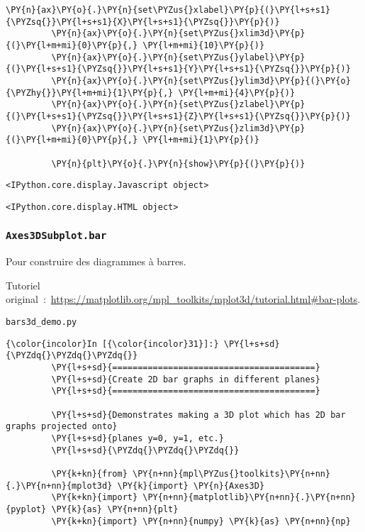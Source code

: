 \begin{Verbatim}[commandchars=\\\{\}]
         \PY{n}{ax}\PY{o}{.}\PY{n}{set\PYZus{}xlabel}\PY{p}{(}\PY{l+s+s1}{\PYZsq{}}\PY{l+s+s1}{X}\PY{l+s+s1}{\PYZsq{}}\PY{p}{)}
         \PY{n}{ax}\PY{o}{.}\PY{n}{set\PYZus{}xlim3d}\PY{p}{(}\PY{l+m+mi}{0}\PY{p}{,} \PY{l+m+mi}{10}\PY{p}{)}
         \PY{n}{ax}\PY{o}{.}\PY{n}{set\PYZus{}ylabel}\PY{p}{(}\PY{l+s+s1}{\PYZsq{}}\PY{l+s+s1}{Y}\PY{l+s+s1}{\PYZsq{}}\PY{p}{)}
         \PY{n}{ax}\PY{o}{.}\PY{n}{set\PYZus{}ylim3d}\PY{p}{(}\PY{o}{\PYZhy{}}\PY{l+m+mi}{1}\PY{p}{,} \PY{l+m+mi}{4}\PY{p}{)}
         \PY{n}{ax}\PY{o}{.}\PY{n}{set\PYZus{}zlabel}\PY{p}{(}\PY{l+s+s1}{\PYZsq{}}\PY{l+s+s1}{Z}\PY{l+s+s1}{\PYZsq{}}\PY{p}{)}
         \PY{n}{ax}\PY{o}{.}\PY{n}{set\PYZus{}zlim3d}\PY{p}{(}\PY{l+m+mi}{0}\PY{p}{,} \PY{l+m+mi}{1}\PY{p}{)}
         
         \PY{n}{plt}\PY{o}{.}\PY{n}{show}\PY{p}{(}\PY{p}{)}
\end{Verbatim}


    
    \begin{verbatim}
<IPython.core.display.Javascript object>
    \end{verbatim}

    
    
    \begin{verbatim}
<IPython.core.display.HTML object>
    \end{verbatim}

    
    \hypertarget{axes3dsubplot.bar}{%
\subsubsection{\texorpdfstring{\texttt{Axes3DSubplot.bar}}{Axes3DSubplot.bar}}\label{axes3dsubplot.bar}}

    Pour construire des diagrammes à barres.

    Tutoriel
original~:~\url{https://matplotlib.org/mpl_toolkits/mplot3d/tutorial.html\#bar-plots}.

    \texttt{bars3d\_demo.py}

    \begin{Verbatim}[commandchars=\\\{\}]
{\color{incolor}In [{\color{incolor}31}]:} \PY{l+s+sd}{\PYZdq{}\PYZdq{}\PYZdq{}}
         \PY{l+s+sd}{========================================}
         \PY{l+s+sd}{Create 2D bar graphs in different planes}
         \PY{l+s+sd}{========================================}
         
         \PY{l+s+sd}{Demonstrates making a 3D plot which has 2D bar graphs projected onto}
         \PY{l+s+sd}{planes y=0, y=1, etc.}
         \PY{l+s+sd}{\PYZdq{}\PYZdq{}\PYZdq{}}
         
         \PY{k+kn}{from} \PY{n+nn}{mpl\PYZus{}toolkits}\PY{n+nn}{.}\PY{n+nn}{mplot3d} \PY{k}{import} \PY{n}{Axes3D}
         \PY{k+kn}{import} \PY{n+nn}{matplotlib}\PY{n+nn}{.}\PY{n+nn}{pyplot} \PY{k}{as} \PY{n+nn}{plt}
         \PY{k+kn}{import} \PY{n+nn}{numpy} \PY{k}{as} \PY{n+nn}{np}
\end{Verbatim}



